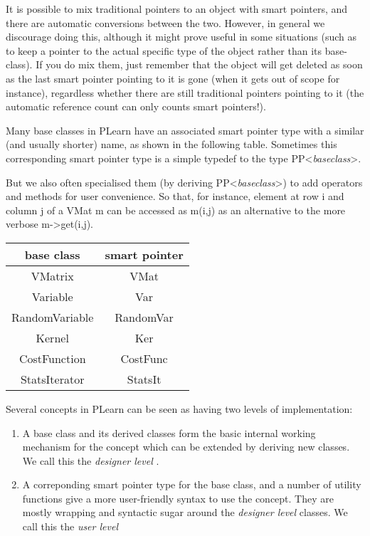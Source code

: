 \documentclass[11pt]{book}
\begin{document}
 It is possible to mix traditional pointers to an object with smart pointers, and there are automatic conversions between the two. However, in general we discourage doing this, although it might prove useful in some situations (such as to keep a pointer to the actual specific type of the object rather than its base-class). If you do mix them, just remember that the object will get deleted as soon as the last smart pointer pointing to it is gone (when it gets out of scope for instance), regardless whether there are still traditional pointers pointing to it (the automatic reference count can only counts smart pointers!). 


 Many base classes in PLearn have an associated smart pointer type
with a similar (and usually shorter) name, as shown in the following
table. Sometimes this corresponding smart pointer type is a simple
typedef to the type PP<\emph{baseclass}>. 

But we also often specialised them (by deriving PP<\emph{baseclass}>)
to add operators and methods for user convenience. So that, for
instance, element at row i and column j of a VMat m can be accessed
as m(i,j) as an alternative to the more verbose m->get(i,j).

\begin{tabular}{|c|c|}
\hline 
base class &smart pointer \\
 \hline 
VMatrix &VMat \\
 \hline 
Variable &Var \\
 \hline 
RandomVariable &RandomVar \\
 \hline 
Kernel &Ker \\
 \hline 
CostFunction &CostFunc \\
 \hline 
StatsIterator &StatsIt \\
 \hline 

\end{tabular}




 Several concepts in PLearn can be seen as having two levels of implementation: 
 \begin{enumerate}
\item  A base class and its derived classes form the basic internal working mechanism for the concept which can be extended by deriving new classes. We call this the \emph{designer level}
.
\item  A correponding smart pointer type for the base class, and a number of utility functions give a more user-friendly syntax to use the concept. They are mostly wrapping and syntactic sugar around the \emph{designer level}
 classes. We call this the \emph{user level}
\end{enumerate}
 
\end{document}
